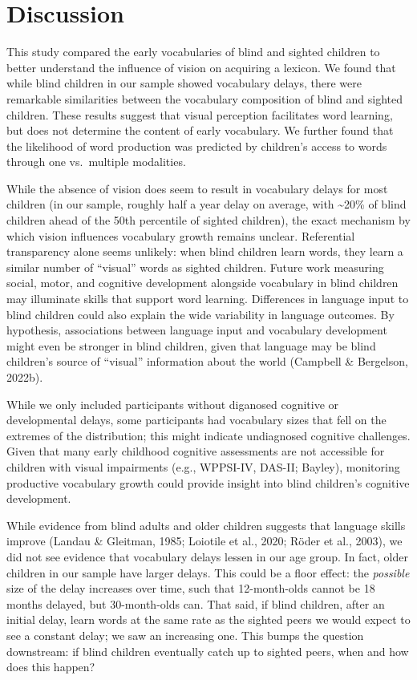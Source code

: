 \documentclass[english,man,floatsintext]{apa6}
\begin{document}
\hypertarget{discussion}{%
\section{Discussion}\label{discussion}}

This study compared the early vocabularies of blind and sighted children to better understand the influence of vision on acquiring a lexicon. We found that while blind children in our sample showed vocabulary delays, there were remarkable similarities between the vocabulary composition of blind and sighted children. These results suggest that visual perception facilitates word learning, but does not determine the content of early vocabulary. We further found that the likelihood of word production was predicted by children's access to words through one vs.~multiple modalities.

While the absence of vision does seem to result in vocabulary delays for most children (in our sample, roughly half a year delay on average, with \textasciitilde{}20\% of blind children ahead of the 50th percentile of sighted children), the exact mechanism by which vision influences vocabulary growth remains unclear. Referential transparency alone seems unlikely: when blind children learn words, they learn a similar number of \enquote{visual} words as sighted children. Future work measuring social, motor, and cognitive development alongside vocabulary in blind children may illuminate skills that support word learning. Differences in language input to blind children could also explain the wide variability in language outcomes. By hypothesis, associations between language input and vocabulary development might even be stronger in blind children, given that language may be blind children's source of \enquote{visual} information about the world (Campbell \& Bergelson, 2022b).

While we only included participants without diganosed cognitive or developmental delays, some participants had vocabulary sizes that fell on the extremes of the distribution; this might indicate undiagnosed cognitive challenges. Given that many early childhood cognitive assessments are not accessible for children with visual impairments (e.g., WPPSI-IV, DAS-II; Bayley), monitoring productive vocabulary growth could provide insight into blind children's cognitive development.

While evidence from blind adults and older children suggests that language skills improve (Landau \& Gleitman, 1985; Loiotile et al., 2020; Röder et al., 2003), we did not see evidence that vocabulary delays lessen in our age group. In fact, older children in our sample have larger delays. This could be a floor effect: the \emph{possible} size of the delay increases over time, such that 12-month-olds cannot be 18 months delayed, but 30-month-olds can. That said, if blind children, after an initial delay, learn words at the same rate as the sighted peers we would expect to see a constant delay; we saw an increasing one. This bumps the question downstream: if blind children eventually catch up to sighted peers, when and how does this happen?
\end{document}
